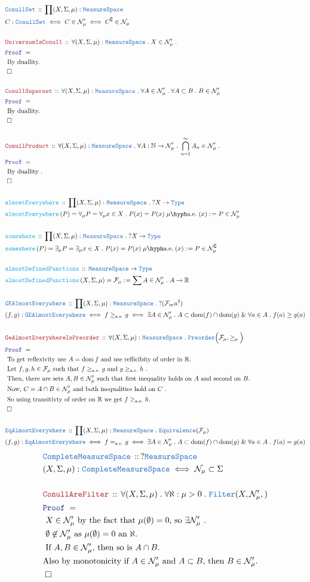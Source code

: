 \documentclass[12pt]{scrartcl}
\newcommand{\TYPE}[1]{\textcolor{NavyBlue}{\mathtt{#1}}}
\newcommand{\FUNC}[1]{\textcolor{Cerulean}{\mathtt{#1}}}
\newcommand{\LOGIC}[1]{\textcolor{Blue}{\mathtt{#1}}}
\newcommand{\THM}[1]{\textcolor{Maroon}{\mathtt{#1}}}
\renewcommand{\.}{\; . \;}
\newcommand{\de}{: \kern 0.1pc =}
\newcommand{\Act}[1]{\left( #1 \right)}
\newcommand{\Theorem}[2]{& \THM{#1} \, :: \, #2 \\ & \Proof = \\ }
\newcommand{\DeclareType}[2]{& \TYPE{#1} \, :: \, #2 \\}
\newcommand{\DefineType}[3]{& #1 : \TYPE{#2} \iff #3 \\}
\newcommand{\DefineNamedType}[4]{& #1 : \TYPE{#2} \iff #3 \iff #4 \\}
\newcommand{\DeclareFunc}[2]{& \FUNC{#1} \, :: \, #2 \\}
\newcommand{\DefineNamedFunc}[4]{&  \FUNC{#1}\Act{#2} = #3 \de #4 \\}
\newcommand{\Page}[1]{ \begin{align*} #1 \end{align*}   }
\renewcommand{\And}{\; \& \;}
\newcommand{\Type}{\TYPE{Type}}
\newcommand{\Reals}{\mathbb{R} }
\newcommand{\Nat}{\mathbb{N} }
\renewcommand{\c}{\complement}
\newcommand{\QED}{\; \square}
\newcommand{\EndProof}{& \QED \\}
\newcommand{\Proof}{\LOGIC{Proof} \; }
\newcommand{\Explain}[1]{& \text{#1.} \\}
\newcommand{\Eq}{\TYPE{Equivalence}}
\DeclareMathOperator*{\dom}{dom}
\newcommand{\MS}{\TYPE{MeasureSpace}}
\newcommand{\CMS}{\TYPE{CompleteMeasureSpace}}
\newcommand{\Null}{\mathcal{N}}
\renewcommand{\ae}{\mathrm{a.e.}}
\newcommand{\F}{\mathcal{F}}
\begin{document}
\Page{
	\DeclareType{ConullSet}
	{
		\prod (X,\Sigma, \mu) : \MS	
	}
	\DefineNamedType{C}{ConullSet}{C \in \Null'_\mu}{C^\c \in \Null_\mu}
	\\
	\Theorem{UniversumIsConull}
	{
		\forall (X,\Sigma,\mu) : \MS \.
		X \in \Null_\mu' \.
	}
	\Explain{ By duallity}
	\EndProof
	\\
	\Theorem{ConullSuperset}
	{
		\forall (X,\Sigma,\mu) : \MS \.
		\forall A \in \Null_\mu' \.
		\forall A \subset B \.
		B \in \Null_\mu'
	}
	\Explain{ By duallity}
	\EndProof
	\\
	\Theorem{ConullProduct}
	{
		\forall (X,\Sigma,\mu) : \MS \.
		\forall A : \Nat \to \Null_\mu' \.
		\bigcap^\infty_{n=1} A_n \in \Null_\mu' \.
	}
	\Explain{ By duallity }
	\EndProof
	\\
	\DeclareFunc{almostEverywhere}
	{
		\prod (X,\Sigma,\mu) : \MS \. 
		?X \to \Type
	}
	\DefineNamedFunc{almostEverywhere}{P}
	{ \forall_\mu P = \forall_\mu x \in X \. P(x) =  P(x)\;\mu\hyph\ae\;(x)  }{P \in \Null'_\mu}
	\\
	\DeclareFunc{somewhere}
	{
		\prod (X,\Sigma,\mu) : \MS \. 
		?X \to \Type
	}
	\DefineNamedFunc{somewhere}{P}
	{ \exists_\mu P = \exists_\mu x \in X \. P(x) =  P(x)\;\mu\hyph\ae\;(x)  }{P \in \Null^\c_\mu}
	\\
	\DeclareFunc{almostDefinedFunctions}{\MS \to \Type}
	\DefineNamedFunc{almostDefinedFunctions}{X,\Sigma,\mu}
	{\F_\mu}
	{
		\sum A \in \Null'_\mu \. A \to \Reals
	}
	\\
	\DeclareType{GEAlmostEverywhere}{\prod (X,\Sigma,\mu) : \MS \. ?(\F_mu^2)}
	\DefineNamedType{(f,g)}{GEAlmostEverywhere}{f \ge_{\ae} g}
	{
		\exists A \in \Null'_\mu \. 
		A \subset \dom(f) \cap \dom(g)  \And
		\forall a \in A \. f(a) \ge g(a)
	}
	\\
	\Theorem{GeAlmostEverywhereIsPreorder}
	{
		\forall (X,\Sigma,\mu) : \MS \.
		\TYPE{Preorder}\Big( \F_\mu, \ge_\mu \Big)
	}
	\Explain{ To get reflexivity use $A = \dom f$  and use reflicibity of order in $\Reals$}
	\Explain{ Let $f,g,h \in \F_\mu$ such that $f \geq_\ae g $ and $g \geq_\ae h$ }
	\Explain{ Then, there are sets $A,B \in \Null'_\mu$ such that first inequality holds on $A$
		and second on $B$}
	\Explain{ Now, $C = A \cap B \in \Null'_\mu$ and both inequalities hold on $C$ }
	\Explain{ So using transitivty of order on $\Reals$ we get $f \geq_\ae h$}
	\EndProof
	\\
	\DeclareType{EqAlmostEverywhere}{\prod (X,\Sigma,\mu) : \MS \. \Eq(\F_\mu)}
	\DefineNamedType{(f,g)}{EqAlmostEverywhere}{f  =_{\ae} g}
	{
		\exists A \in \Null'_\mu \. 
		A \subset \dom(f) \cap \dom(g)  \And
		\forall a \in A \. f(a) = g(a)
	}
}
\Page{
	\DeclareType{\CMS}{?\MS}
	\DefineType{(X,\Sigma,\mu)}{\CMS}{\Null_\mu \subset \Sigma}
	\\
	\Theorem{ConullAreFilter}
	{
		\forall (X,\Sigma,\mu) \.
		\forall \aleph : \mu > 0 \.
		\TYPE{Filter}(X,\Null'_\mu,)
	}
	\Explain{
		 $X \in \Null'_\mu$ by the fact that $\mu(\emptyset) = 0$, so $\exists\Null'_\mu$
	}
	\Explain{ 
		$\emptyset \not \in \Null'_\mu$  as $\mu(\emptyset) = 0 $ an $\aleph$}
	\Explain{
		If $A,B \in \Null'_\mu$, then so is $A \cap B$}
	\Explain{Also by monotonicity if $A \in \Null'_\mu$ and $A \subset B$, then $B \in \Null'_\mu$}
	\EndProof
}
\newpage
\end{document}
